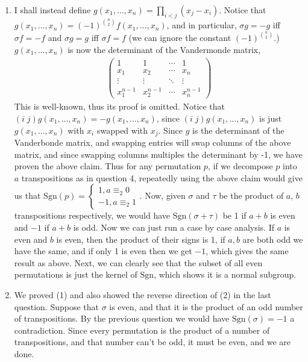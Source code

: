 \documentclass[12pt]{article}
\theoremstyle{definitionstyle}
\begin{document}
\begin{enumerate}[leftmargin=\labelsep]
		\item I shall instead define $g(x_1, \ldots, x_n) = \prod_{i < j} (x_j-x_i)$. Notice that $g(x_1, \ldots, x_n) = (-1)^{{n \choose 2}} f(x_1, \ldots, x_n)$, and in particular, $\sigma g = -g$ iff $\sigma f = -f$ and $\sigma g = g$ iff $\sigma f = f$ (we can ignore the constant $(-1)^{{n \choose 2}}$.) $g(x_1, \ldots, x_n)$ is now the determinant of the Vandermonde matrix,
		\begin{align*}
			\begin{pmatrix}
			1 & 1 & \cdots & 1 \\
			x_1 & x_2 & \cdots & x_n \\
			\vdots & \vdots & \ddots & \vdots \\
			x_1^{n-1} & x_2^{n-1} & \cdots & x_n^{n-1}
		\end{pmatrix}
		\end{align*}
		This is well-known, thus its proof is omitted. Notice that $(i \; j) g(x_1, \ldots, x_n) = -g(x_1, \ldots, x_n)$, since $(i \; j) g(x_1, \ldots, x_n)$ is just $g(x_1, \ldots, x_n)$ with $x_i$ swapped with $x_j$. Since $g$ is the determinant of the Vanderbonde matrix, and swapping entries will swap columns of the above matrix, and since swapping columns multiples the determinant by -1, we have proven the above claim. Thus for any permutation $p$, if we decompose $p$ into $a$ transpositions as in question 4, repeatedly using the above claim would give us that $\mathrm{Sgn}(p) = \begin{cases}
			1, a \equiv_2 0 \\
			-1, a \equiv_2 1
		\end{cases}$. Now, given $\sigma$ and $\tau$ be the product of $a$, $b$ transpositions respectively, we would have $\mathrm{Sgn}(\sigma + \tau)$ be 1 if $a + b$ is even and $-1$ if $a+b$ is odd. Now we can just run a case by case analysis. If $a$ is even and $b$ is even, then the product of their signs is 1, if $a, b$ are both odd we have the same, and if only 1 is even then we get $-1$, which gives the same result as above. Next, we can clearly see that the subset of all even permutations is just the kernel of $\mathrm{Sgn}$, which shows it is a normal subgroup.
	
		\item We proved (1) and also showed the reverse direction of (2) in the last question. Suppose that $\sigma$ is even, and that it is the product of an odd number of transpositions. By the previous question we would have $\mathrm{Sgn}(\sigma) = -1$ a contradiction. Since every permutation is the product of a number of transpositions, and that number can't be odd, it must be even, and we are done.
		

\end{enumerate}
\end{document}
